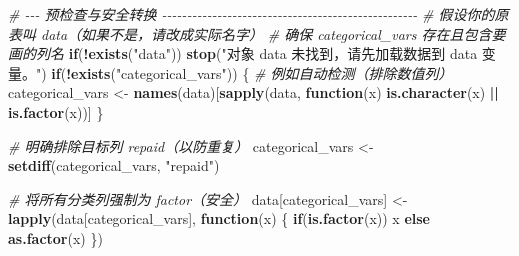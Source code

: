 \documentclass[
]{article}
\newenvironment{Shaded}{\begin{snugshade}}{\end{snugshade}}
\newcommand{\CommentTok}[1]{\textcolor[rgb]{0.56,0.35,0.01}{\textit{#1}}}
\newcommand{\ControlFlowTok}[1]{\textcolor[rgb]{0.13,0.29,0.53}{\textbf{#1}}}
\newcommand{\FunctionTok}[1]{\textcolor[rgb]{0.13,0.29,0.53}{\textbf{#1}}}
\newcommand{\NormalTok}[1]{#1}
\newcommand{\OtherTok}[1]{\textcolor[rgb]{0.56,0.35,0.01}{#1}}
\newcommand{\SpecialCharTok}[1]{\textcolor[rgb]{0.81,0.36,0.00}{\textbf{#1}}}
\newcommand{\StringTok}[1]{\textcolor[rgb]{0.31,0.60,0.02}{#1}}
\begin{document}
\begin{Shaded}
\begin{Highlighting}[]
\CommentTok{\# {-}{-}{-} 预检查与安全转换 {-}{-}{-}{-}{-}{-}{-}{-}{-}{-}{-}{-}{-}{-}{-}{-}{-}{-}{-}{-}{-}{-}{-}{-}{-}{-}{-}{-}{-}{-}{-}{-}{-}{-}{-}{-}{-}{-}{-}{-}{-}{-}{-}{-}{-}{-}{-}{-}{-}{-}{-}}
\CommentTok{\# 假设你的原表叫 data（如果不是，请改成实际名字）}
\CommentTok{\# 确保 categorical\_vars 存在且包含要画的列名}
\ControlFlowTok{if}\NormalTok{(}\SpecialCharTok{!}\FunctionTok{exists}\NormalTok{(}\StringTok{"data"}\NormalTok{)) }\FunctionTok{stop}\NormalTok{(}\StringTok{"对象 \textquotesingle{}data\textquotesingle{} 未找到，请先加载数据到 data 变量。"}\NormalTok{)}
\ControlFlowTok{if}\NormalTok{(}\SpecialCharTok{!}\FunctionTok{exists}\NormalTok{(}\StringTok{"categorical\_vars"}\NormalTok{)) \{}
  \CommentTok{\# 例如自动检测（排除数值列）}
\NormalTok{  categorical\_vars }\OtherTok{\textless{}{-}} \FunctionTok{names}\NormalTok{(data)[}\FunctionTok{sapply}\NormalTok{(data, }\ControlFlowTok{function}\NormalTok{(x) }\FunctionTok{is.character}\NormalTok{(x) }\SpecialCharTok{||} \FunctionTok{is.factor}\NormalTok{(x))]}
\NormalTok{\}}

\CommentTok{\# 明确排除目标列 \textquotesingle{}repaid\textquotesingle{}（以防重复）}
\NormalTok{categorical\_vars }\OtherTok{\textless{}{-}} \FunctionTok{setdiff}\NormalTok{(categorical\_vars, }\StringTok{"repaid"}\NormalTok{)}

\CommentTok{\# 将所有分类列强制为 factor（安全）}
\NormalTok{data[categorical\_vars] }\OtherTok{\textless{}{-}} \FunctionTok{lapply}\NormalTok{(data[categorical\_vars], }\ControlFlowTok{function}\NormalTok{(x) \{}
  \ControlFlowTok{if}\NormalTok{(}\FunctionTok{is.factor}\NormalTok{(x)) x }\ControlFlowTok{else} \FunctionTok{as.factor}\NormalTok{(x)}
\NormalTok{\})}


\end{Highlighting}
\end{Shaded}
\end{document}
